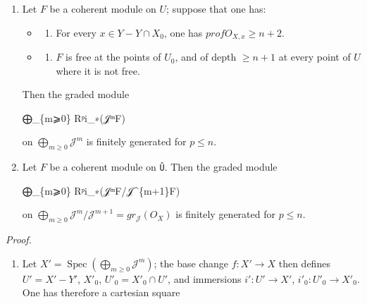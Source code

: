 \documentclass[
  11pt,
  a4paper,
]{book}
\newenvironment{Shaded}{}{}
\newcommand{\NormalTok}[1]{#1}
\providecommand{\tightlist}{%
  \setlength{\itemsep}{0pt}\setlength{\parskip}{0pt}}
\begin{document}
\begin{enumerate}
\def\labelenumi{\arabic{enumi}.}
\item
  Let \(F\) be a coherent module on \(U\); suppose that one has:

  \begin{itemize}
  \tightlist
  \item
    \begin{enumerate}
    \def\labelenumii{\alph{enumii})}
    \setcounter{enumii}{2}
    \tightlist
    \item
      For every \(x \in Y - Y \cap X_{0}\), one has
      \(prof O_{X,x} \geqslant n + 2\).
    \end{enumerate}
  \item
    \begin{enumerate}
    \def\labelenumii{\alph{enumii})}
    \setcounter{enumii}{3}
    \tightlist
    \item
      \(F\) is free at the points of \(U_{0}\), and of depth
      \(\geqslant n + 1\) at every point of \(U\) where it is not free.
    \end{enumerate}
  \end{itemize}

  Then the graded module

\begin{Shaded}
\begin{Highlighting}[]
\NormalTok{⨁\_\{m⩾0\} Rᵖi\_∗(𝒥ᵐF)}
\end{Highlighting}
\end{Shaded}

  on \(\bigoplus_{m\geqslant 0} \mathcal{J}^{m}\) is finitely generated
  for \(p \leqslant n\).
\item
  Let \(F\) be a coherent module on \texttt{Û}. Then the graded module

\begin{Shaded}
\begin{Highlighting}[]
\NormalTok{⨁\_\{m⩾0\} Rᵖi\_∗(𝒥ᵐF/𝒥\^{}\{m+1\}F)}
\end{Highlighting}
\end{Shaded}

  on
  \(\bigoplus_{m\geqslant 0} \mathcal{J}^{m}/\mathcal{J}^{m+1} = gr_{\mathcal{J}}(O_{X})\)
  is finitely generated for \(p \leqslant n\).
\end{enumerate}

\emph{Proof.}

\begin{enumerate}
\def\labelenumi{(\arabic{enumi})}
\tightlist
\item
  Let
  \(X' = \operatorname{Spec}(\bigoplus_{m\geqslant 0} \mathcal{J}^{m})\);
  the base change \(f: X' \to X\) then defines \(U' = X' - Y'\),
  \(X'_{0}\), \(U'_{0} = X'_{0} \cap U'\), and immersions
  \(i': U' \to X'\), \(i'_{0}: U'_{0} \to X'_{0}\). One has therefore a
  cartesian square
\end{enumerate}
\end{document}
